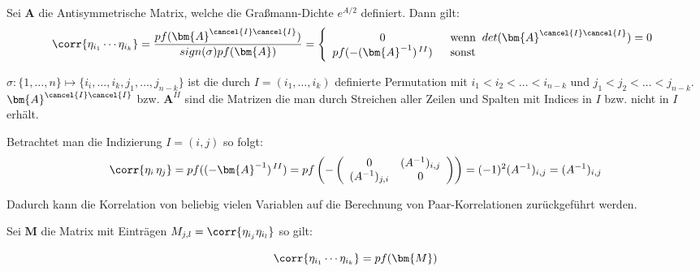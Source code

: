 \begin{grayframe}[frametitle = {Graßmann Korrelationen von Monomen}]
Sei $\bm{A}$ die Antisymmetrische Matrix, welche die Graßmann-Dichte $e^{A/2}$ definiert. Dann gilt:
\begin{equation} \label{eq: Calculate_GV_Corr}
    \corr{\eta_{i_1} \cdots \eta_{i_k}}
    = \frac{pf(\bm{A}^{\cancel{I} \cancel{I}}) }{sign(\sigma) pf(\bm{A})}
    =  \left\{ \begin{array}{cl} 0 & \;\;\text{wenn}\;\; det(\bm{A}^{\cancel{I} \cancel{I}}) = 0 \\ pf(-(\bm{A}^{-1})^{\,II}) & \;\; \text{sonst} \end{array} \right. 
\end{equation} 

\noindent $\sigma: \{1,\dots, n\} \mapsto \{i_i, \dots, i_k, j_1, \dots, j_{n-k}\}$ ist die durch $I = (i_1,\dots,i_k)$ definierte Permutation mit $i_1 < i_2 < \dots < i_{n-k}$ und $j_1 < j_2 < \dots < j_{n-k}$. $\bm{A}^{\cancel{I} \cancel{I}}$ bzw. $\bm{A}^{II}$ sind die Matrizen die man durch Streichen aller Zeilen und Spalten mit Indices in $I$ bzw. nicht in $I$ erhält.
\end{grayframe}

\noindent Betrachtet man die Indizierung $I=(i,j)$ so folgt:
\begin{equation}
\corr{\eta_i\,\eta_j} 
    = pf((-\bm{A}^{-1})^{\,II} )
    = pf \left(                                   -\left(\begin{array}{cc} 
        0 & (A^{-1})_{i,j}     \\
        (A^{-1})_{j,i} & 0
    \end{array}\right) \right)
    = (-1)^2 (A^{-1})_{i,j} 
    = (A^{-1})_{i,j}  \nonumber
\end{equation}

\noindent Dadurch kann die Korrelation von beliebig vielen Variablen auf die Berechnung von Paar-Korrelationen zurückgeführt werden.

\begin{grayframe}[frametitle = {Berechnung von Monom Korrelation mit Paar-Korrelationen}]
Sei $\bm{M}$ die Matrix mit Einträgen $M_{j,l} = \corr{\eta_{i_j} \eta_{i_l}}$ so gilt:

\begin{equation} \label{eq: calc monom corr with pair corr matrix}
    \corr{\eta_{i_1} \cdots \eta_{i_k}}
    =  pf(\bm{M})
\end{equation} 

\end{grayframe}